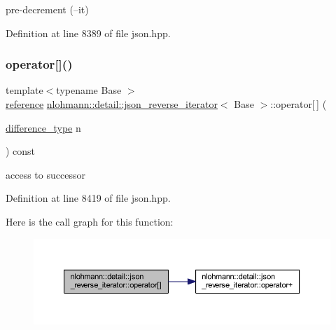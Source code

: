 pre-\/decrement (--it) 



Definition at line 8389 of file json.\+hpp.

\mbox{\label{classnlohmann_1_1detail_1_1json__reverse__iterator_a8ed9e445e03c49c46612eb7f7d55bb61}} 
\subsubsection{\texorpdfstring{operator[]()}{operator[]()}}
{\footnotesize\ttfamily template$<$typename Base $>$ \\
\mbox{\hyperlink{classnlohmann_1_1detail_1_1json__reverse__iterator_a42f51a69bac7b2aebb613b2164e457f1}{reference}} \mbox{\hyperlink{classnlohmann_1_1detail_1_1json__reverse__iterator}{nlohmann\+::detail\+::json\+\_\+reverse\+\_\+iterator}}$<$ Base $>$\+::operator\mbox{[}$\,$\mbox{]} (\begin{DoxyParamCaption}\item[{\mbox{\hyperlink{classnlohmann_1_1detail_1_1json__reverse__iterator_a9ab55987c05ec6427ad36082e351cc45}{difference\+\_\+type}}}]{n }\end{DoxyParamCaption}) const\hspace{0.3cm}{\ttfamily [inline]}}



access to successor 



Definition at line 8419 of file json.\+hpp.

Here is the call graph for this function\+:
\nopagebreak
\begin{figure}[H]
\begin{center}
\leavevmode
\includegraphics[width=350pt]{classnlohmann_1_1detail_1_1json__reverse__iterator_a8ed9e445e03c49c46612eb7f7d55bb61_cgraph}
\end{center}
\end{figure}
\mbox{\label{classnlohmann_1_1detail_1_1json__reverse__iterator_ae22803d442d483041d17239615f83b58}} 
